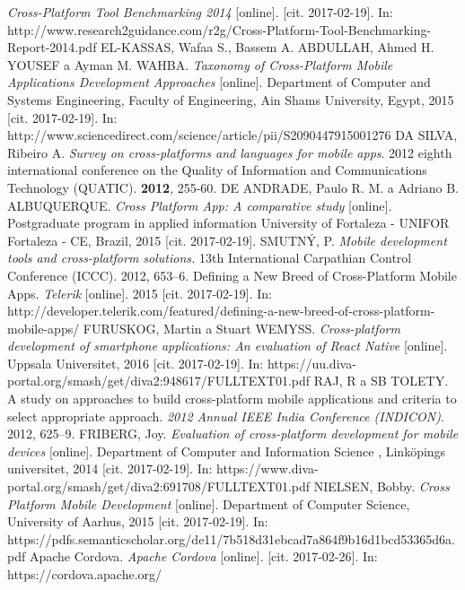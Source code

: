 \documentclass[english,master,public,dept460,male,cpdeclaration,oneside]{diploma}
\begin{document}
\begin{thebibliography}{99}
	 \textit{Cross-Platform Tool Benchmarking 2014} [online]. [cit. 2017-02-19]. In: http://www.research2guidance.com/r2g/Cross-Platform-Tool-Benchmarking-Report-2014.pdf
	EL-KASSAS, Wafaa S., Bassem A. ABDULLAH, Ahmed H. YOUSEF a Ayman M. WAHBA. \textit{Taxonomy of Cross-Platform Mobile Applications Development Approaches} [online]. Department of Computer and Systems Engineering, Faculty of Engineering, Ain Shams University, Egypt, 2015 [cit. 2017-02-19]. In: http://www.sciencedirect.com/science/article/pii/S2090447915001276
	 DA SILVA, Ribeiro A. \textit{Survey on cross-platforms and languages for mobile apps}. 2012 eighth international conference on the Quality of Information and Communications Technology (QUATIC). \textbf{2012}, 255-60.
	DE ANDRADE, Paulo R. M. a Adriano B. ALBUQUERQUE. \textit{Cross Platform App: A comparative study} [online]. Postgraduate program in applied information University of Fortaleza - UNIFOR Fortaleza - CE, Brazil, 2015 [cit. 2017-02-19].
	SMUTNÝ, P. \textit{Mobile development tools and cross-platform solutions.} 13th International Carpathian Control Conference (ICCC). 2012, 653–6.
	 Defining a New Breed of Cross-Platform Mobile Apps. \textit{Telerik} [online]. 2015 [cit. 2017-02-19]. In: http://developer.telerik.com/featured/defining-a-new-breed-of-cross-platform-mobile-apps/
	 FURUSKOG, Martin a Stuart WEMYSS. \textit{Cross-platform development of smartphone applications: An evaluation of React Native} [online]. Uppsala Universitet, 2016 [cit. 2017-02-19]. In: https://uu.diva-portal.org/smash/get/diva2:948617/FULLTEXT01.pdf
	 RAJ, R a SB TOLETY. A study on approaches to build cross-platform mobile applications and criteria to select appropriate approach. \textit{2012 Annual IEEE India Conference (INDICON)}. 2012, 625–9.
	 FRIBERG, Joy. \textit{Evaluation of cross-platform development for mobile devices} [online]. Department of Computer and Information Science , Linköpings universitet, 2014 [cit. 2017-02-19]. In: https://www.diva-portal.org/smash/get/diva2:691708/FULLTEXT01.pdf
	NIELSEN, Bobby. \textit{Cross Platform Mobile Development} [online]. Department of Computer Science, University of Aarhus, 2015 [cit. 2017-02-19]. In: https://pdfs.semanticscholar.org/de11/7b518d31ebcad7a864f9b16d1bcd53365d6a.pdf
	 Apache Cordova. \textit{Apache Cordova} [online]. [cit. 2017-02-26]. In: https://cordova.apache.org/	

\end{thebibliography}
\end{document}
